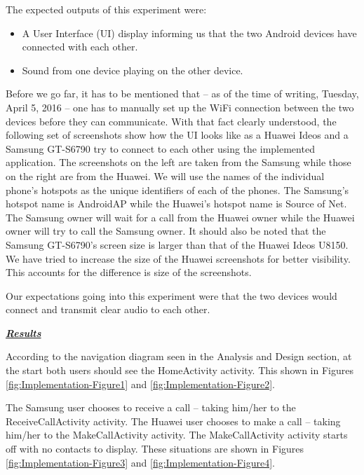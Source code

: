 \documentclass[12pt,svgnames,smaller]{article} %
\begin{document}
	The expected outputs of this experiment were:
	
	\begin{itemize}
		\item A User Interface (UI) display informing us that the two Android devices have connected with each other.
		\item Sound from one device playing on the other device.
	\end{itemize}
	
	Before we go far, it has to be mentioned that – as of the time of writing, Tuesday, April 5, 2016 – one has to manually set up the WiFi connection between the two devices before they can communicate. With that fact clearly understood, the following set of screenshots show how the UI looks like as a Huawei Ideos and a Samsung GT-S6790 try to connect to each other using the implemented application.  The screenshots on the left are taken from the Samsung while those on the right are from the Huawei. We will use the names of the individual phone’s hotspots as the unique identifiers of each of the phones. The Samsung’s hotspot name is AndroidAP while the Huawei’s hotspot name is Source of Net. The Samsung owner will wait for a call from the Huawei owner while the Huawei owner will try to call the Samsung owner. It should also be noted that the Samsung GT-S6790’s screen size is larger than that of the Huawei Ideos U8150. We have tried to increase the size of the Huawei screenshots for better visibility. This accounts for the difference is size of the screenshots.
	
	Our expectations going into this experiment were that the two devices would connect and transmit clear audio to each other.


	\textbf{\textit{\underline{Results}}}
	
		According to the navigation diagram seen in the Analysis and Design section, at the start both users should see the HomeActivity activity. This shown in Figures \ref{fig:Implementation-Figure1} and \ref{fig:Implementation-Figure2}.

		The Samsung user chooses to receive a call – taking him/her to the ReceiveCallActivity activity. The Huawei user chooses to make a call – taking him/her to the MakeCallActivity activity. The MakeCallActivity activity starts off with no contacts to display. These situations are shown in Figures \ref{fig:Implementation-Figure3} and \ref{fig:Implementation-Figure4}.
\end{document}
